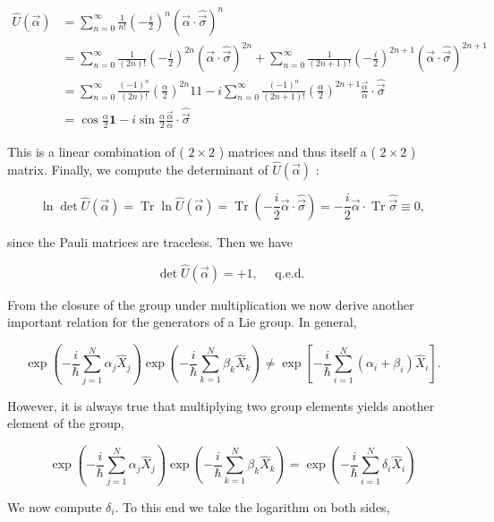 \documentclass[10pt, letterpaper]{article}
\begin{document}
$$
\begin{aligned}
\hat{U}(\vec{\alpha}) & =\sum_{n=0}^{\infty} \frac{1}{n!}\left(-\frac{i}{2}\right)^{n}(\vec{\alpha} \cdot \hat{\vec{\sigma}})^{n} \\
& =\sum_{n=0}^{\infty} \frac{1}{(2 n)!}\left(-\frac{i}{2}\right)^{2 n}(\vec{\alpha} \cdot \hat{\vec{\sigma}})^{2 n}+\sum_{n=0}^{\infty} \frac{1}{(2 n+1)!}\left(-\frac{i}{2}\right)^{2 n+1}(\vec{\alpha} \cdot \hat{\vec{\sigma}})^{2 n+1} \\
& =\sum_{n=0}^{\infty} \frac{(-1)^{n}}{(2 n)!}\left(\frac{\alpha}{2}\right)^{2 n} 11-i \sum_{n=0}^{\infty} \frac{(-1)^{n}}{(2 n+1)!}\left(\frac{\alpha}{2}\right)^{2 n+1} \frac{\vec{\alpha}}{\alpha} \cdot \hat{\vec{\sigma}} \\
& =\cos \frac{\alpha}{2} \mathbf{1}-i \sin \frac{\alpha}{2} \frac{\vec{\alpha}}{\alpha} \cdot \hat{\vec{\sigma}}
\end{aligned}
$$

This is a linear combination of ( $2 \times 2$ ) matrices and thus itself a ( $2 \times 2$ ) matrix. Finally, we compute the determinant of $\hat{U}(\vec{\alpha})$ :

$$
\ln \operatorname{det} \hat{U}(\vec{\alpha})=\operatorname{Tr} \ln \hat{U}(\vec{\alpha})=\operatorname{Tr}\left(-\frac{i}{2} \vec{\alpha} \cdot \hat{\vec{\sigma}}\right)=-\frac{i}{2} \vec{\alpha} \cdot \operatorname{Tr} \hat{\vec{\sigma}} \equiv 0,
$$

since the Pauli matrices are traceless. Then we have

$$
\operatorname{det} \hat{U}(\vec{\alpha})=+1, \quad \text { q.e.d. }
$$

From the closure of the group under multiplication we now derive another important relation for the generators of a Lie group. In general,

$$
\exp \left(-\frac{i}{\hbar} \sum_{j=1}^{N} \alpha_{j} \hat{X}_{j}\right) \exp \left(-\frac{i}{\hbar} \sum_{k=1}^{N} \beta_{k} \hat{X}_{k}\right) \neq \exp \left[-\frac{i}{\hbar} \sum_{i=1}^{N}\left(\alpha_{i}+\beta_{i}\right) \hat{X}_{i}\right] .
$$

However, it is always true that multiplying two group elements yields another element of the group,

$$
\exp \left(-\frac{i}{\hbar} \sum_{j=1}^{N} \alpha_{j} \hat{X}_{j}\right) \exp \left(-\frac{i}{\hbar} \sum_{k=1}^{N} \beta_{k} \hat{X}_{k}\right)=\exp \left(-\frac{i}{\hbar} \sum_{i=1}^{N} \delta_{i} \hat{X}_{i}\right)
$$

We now compute $\delta_{i}$. To this end we take the logarithm on both sides,
\end{document}
